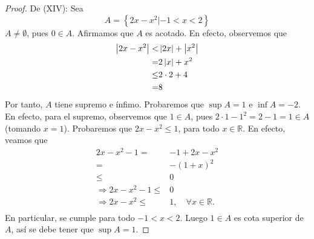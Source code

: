 \documentclass[12pt]{article}
\begin{document}
\begin{enumerate}
\begin{proof}
        De (XIV): Sea
        \begin{equation*}
            A = \left\{2x-x^2|-1<x<2\right\}
        \end{equation*}
        $A\neq\emptyset$, pues $0\in A$. Afirmamos que $A$ es acotado. En efecto, observemos que
        \begin{equation*}
            \begin{split}
                \left| 2x-x^2 \right|<&\left| 2x \right|+\left| x^2 \right|\\
                =&2\left| x \right|+x^2\\
                \leq&2\cdot2+4\\
                =&8
            \end{split}
        \end{equation*}
        Por tanto, $A$ tiene supremo e ínfimo. Probaremos que $\sup A = 1$ e $\inf A = -2$. En efecto, para el supremo, observemos que $1\in A$, pues $2\cdot 1-1^2=2-1=1\in A$ (tomando $x=1$). Probaremos que $2x-x^2\leq 1$, para todo $x\in\mathbb{R}$. En efecto, veamos que 
        \begin{equation*}
            \begin{split}
                2x-x^2-1=&-1+2x-x^2\\
                =&-(1+x)^2\\
                \leq& 0 \\
                \Rightarrow 2x-x^2-1\leq& 0\\
                \Rightarrow 2x-x^2\leq& 1,\quad \forall x\in\mathbb{R}.\\
            \end{split}
        \end{equation*}
        En particular, se cumple para todo $-1<x<2$. Luego $1\in A$ es cota superior de $A$, así se debe tener que $\sup A = 1$.


\end{proof}
\end{enumerate}
\end{document}
